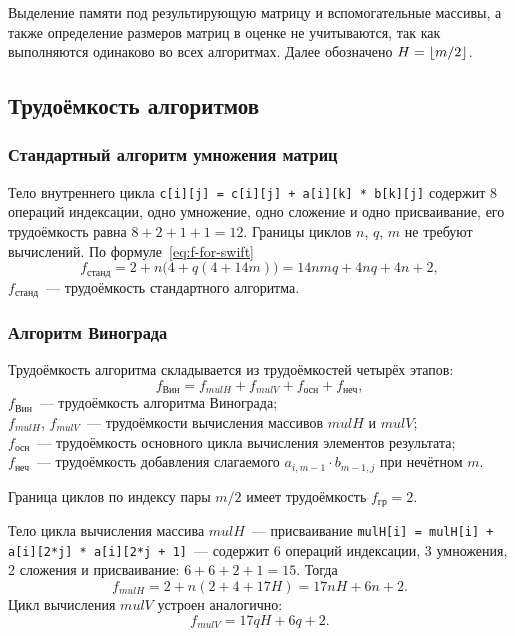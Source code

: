 Выделение памяти под результирующую матрицу и вспомогательные массивы, а также определение размеров матриц в оценке не учитываются, так как выполняются одинаково во всех алгоритмах. Далее обозначено $H = \lfloor m/2 \rfloor$.

\subsection{Трудоёмкость алгоритмов}

\subsubsection{Стандартный алгоритм умножения матриц}
Тело внутреннего цикла \texttt{c[i][j] = c[i][j] + a[i][k] * b[k][j]} содержит 8 операций индексации, одно умножение, одно сложение и одно присваивание, его трудоёмкость равна $8 + 2 + 1 + 1 = 12$. Границы циклов $n$, $q$, $m$ не требуют вычислений. По формуле~\eqref{eq:f-for-swift}
\begin{equation}
	\label{eq:f-std}
	f_{\text{станд}} = 2 + n \bigl(4 + q (4 + 14m)\bigr) = 14nmq + 4nq + 4n + 2,
\end{equation}
\where{} $f_{\text{станд}}$~--- трудоёмкость стандартного алгоритма.

\subsubsection{Алгоритм Винограда}
Трудоёмкость алгоритма складывается из трудоёмкостей четырёх этапов:
\begin{equation}
	f_{\text{Вин}} = f_{mulH} + f_{mulV} + f_{\text{осн}} + f_{\text{неч}},
\end{equation}
\where{} $f_{\text{Вин}}$~--- трудоёмкость алгоритма Винограда;\\
$f_{mulH}$, $f_{mulV}$~--- трудоёмкости вычисления массивов $mulH$ и $mulV$;\\
$f_{\text{осн}}$~--- трудоёмкость основного цикла вычисления элементов результата;\\
$f_{\text{неч}}$~--- трудоёмкость добавления слагаемого $a_{i,m-1} \cdot b_{m-1,j}$ при нечётном $m$.

Граница циклов по индексу пары $m / 2$ имеет трудоёмкость $f_{\text{гр}} = 2$.

Тело цикла вычисления массива $mulH$~--- присваивание \texttt{mulH[i] = mulH[i] + a[i][2*j] * a[i][2*j + 1]}~--- содержит 6 операций индексации, 3 умножения, 2 сложения и присваивание: $6 + 6 + 2 + 1 = 15$. Тогда
\begin{equation}
	f_{mulH} = 2 + n (2 + 4 + 17H) = 17nH + 6n + 2.
\end{equation}
Цикл вычисления $mulV$ устроен аналогично:
\begin{equation}
	f_{mulV} = 17qH + 6q + 2.
\end{equation}


